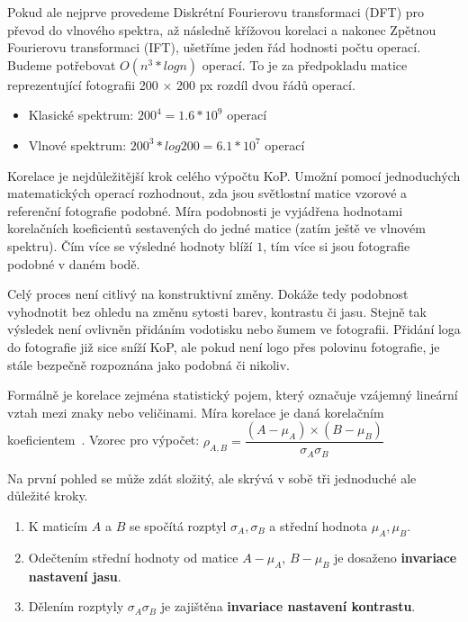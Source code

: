 Pokud ale nejprve provedeme Diskrétní Fourierovu transformaci (DFT) pro převod do vlnového spektra, až následně křížovou korelaci a nakonec Zpětnou Fourierovu transformaci (IFT), ušetříme jeden řád hodnosti počtu operací. Budeme potřebovat $ O(n^3 * logn) $ operací. To je za předpokladu matice reprezentující fotografii 200 × 200 px rozdíl dvou řádů operací.
\begin{itemize}
	\setlength{\parskip}{0pt}
	\setlength{\itemsep}{0pt}
	\item{Klasické spektrum: $ 200^4 = 1.6 * 10^9 $ operací}
	\item{Vlnové spektrum: $ 200^3 * log 200 = 6.1 * 10^7 $ operací}
\end{itemize}

Korelace je nejdůležitější krok celého výpočtu KoP. Umožní pomocí jednoduchých matematických operací rozhodnout, zda jsou světlostní matice vzorové a referenční fotografie podobné. Míra podobnosti je vyjádřena hodnotami korelačních koeficientů sestavených do jedné matice (zatím ještě ve vlnovém spektru). Čím více se výsledné hodnoty blíží $ 1 $, tím více si jsou fotografie podobné v daném bodě.

Celý proces není citlivý na konstruktivní změny. Dokáže tedy podobnost vyhodnotit bez ohledu na změnu sytosti barev, kontrastu či jasu. Stejně tak výsledek není ovlivněn přidáním vodotisku nebo šumem ve fotografii. Přidání loga do fotografie již sice sníží KoP, ale pokud není logo přes polovinu fotografie, je stále bezpečně rozpoznána jako podobná či nikoliv.

Formálně je korelace zejména statistický pojem, který označuje vzájemný lineární vztah mezi znaky nebo veličinami. Míra korelace je daná korelačním koeficientem~\cite{correlation}. 
Vzorec pro výpočet: $ \rho_{A,B} = \dfrac{(A - \mu_{A}) × (B - \mu_{B})}{\sigma_{A}\sigma_{B}} $

Na první pohled se může zdát složitý, ale skrývá v sobě tři jednoduché ale důležité kroky.
\begin{enumerate}
	\setlength{\parskip}{0pt}
	\setlength{\itemsep}{0pt}
	\item{K maticím $ A $ a $ B $ se spočítá rozptyl $ \sigma_{A}, \sigma_{B} $ a střední hodnota $ \mu_{A}, \mu_{B} $.}
	\item{Odečtením střední hodnoty od matice $ A - \mu_{A} $, $ B - \mu_{B} $ je dosaženo \textbf{invariace nastavení jasu}.}
	\item{Dělením rozptyly $ \sigma_{A} \sigma_{B} $ je zajištěna \textbf{invariace nastavení kontrastu}.}
\end{enumerate}


